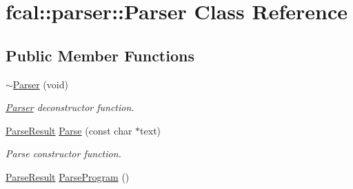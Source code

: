 \hypertarget{classfcal_1_1parser_1_1Parser}{}\section{fcal\+:\+:parser\+:\+:Parser Class Reference}
\label{classfcal_1_1parser_1_1Parser}
\subsection*{Public Member Functions}
\begin{DoxyCompactItemize}
\item 
\hyperlink{classfcal_1_1parser_1_1Parser_aab2e272d7a2e630fa248a61aa3b22653}{$\sim$\+Parser} (void)\hypertarget{classfcal_1_1parser_1_1Parser_aab2e272d7a2e630fa248a61aa3b22653}{}\label{classfcal_1_1parser_1_1Parser_aab2e272d7a2e630fa248a61aa3b22653}

\begin{DoxyCompactList}\small\item\em \hyperlink{classfcal_1_1parser_1_1Parser}{Parser} deconstructor function. \end{DoxyCompactList}\item 
\hyperlink{classfcal_1_1parser_1_1ParseResult}{Parse\+Result} \hyperlink{classfcal_1_1parser_1_1Parser_a57428b932759f7a6d5d65ff6e83c3ed1}{Parse} (const char $\ast$text)\hypertarget{classfcal_1_1parser_1_1Parser_a57428b932759f7a6d5d65ff6e83c3ed1}{}\label{classfcal_1_1parser_1_1Parser_a57428b932759f7a6d5d65ff6e83c3ed1}

\begin{DoxyCompactList}\small\item\em Parse constructor function. \end{DoxyCompactList}\item 
\hyperlink{classfcal_1_1parser_1_1ParseResult}{Parse\+Result} \hyperlink{classfcal_1_1parser_1_1Parser_a43de3cc3ab812c746520188acad91b3d}{Parse\+Program} ()\hypertarget{classfcal_1_1parser_1_1Parser_a43de3cc3ab812c746520188acad91b3d}{}\label{classfcal_1_1parser_1_1Parser_a43de3cc3ab812c746520188acad91b3d}


\end{DoxyCompactItemize}
